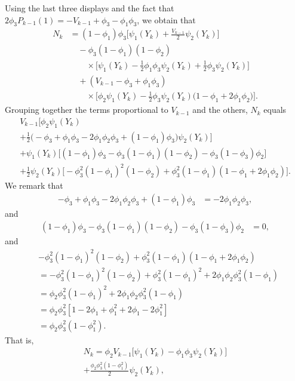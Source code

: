 \documentclass[journal]{IEEEtran}
\newcommand{\1}{\boldsymbol{1}}
\begin{document}
  Using the last three displays and the fact that
  $2\phi_3P_{k-1}(1) = -V_{k-1} + \phi_3 - \phi_1\phi_3$, we obtain that
  \begin{align*}
	N_k%
	&=(1-\phi_1)\phi_3\Big[\psi_1(Y_k) + \frac{V_{k-1}}{2}\psi_2(Y_k) \Big]\\%
        &\quad-\phi_3(1 - \phi_1)(1 - \phi_2)\\
    &\qquad\times \Big[\psi_1(Y_k) - \frac{1}{2}\phi_1\phi_3\psi_2(Y_k) + \frac{1}{2}\phi_3\psi_2(Y_k) \Big]\\%
        &\quad+(V_{k-1} - \phi_3 + \phi_1\phi_3 )\\
    &\qquad\times \Big[\phi_2\psi_1(Y_k) - \frac{1}{2}\phi_3\psi_2(Y_k)\Big(1 - \phi_1 + 2\phi_1\phi_2\Big) \Big].
  \end{align*}
  Grouping together the terms proportional to $V_{k-1}$ and the others, $N_k$ equals
  \begin{multline*}
    V_{k-1}\Big[\phi_2\psi_1(Y_k)\\
    + \frac{1}{2}\Big(-\phi_3 + \phi_1\phi_3 - 2\phi_1\phi_2\phi_3 + (1-\phi_1)\phi_3 \Big)\psi_2(Y_k) \Big]\\
   + \psi_1(Y_k)\Big[
 (1-\phi_1)\phi_3 - \phi_3(1 - \phi_1)(1 - \phi_2) - \phi_3(1-\phi_3)\phi_2
   \Big]\\
   + \frac{1}{2}\psi_2(Y_k)\Big[-\phi_3^2(1-\phi_1)^2(1-\phi_2)%
   + \phi_3^2(1-\phi_1)(1 - \phi_1 + 2\phi_1\phi_2)
   \Big].
  \end{multline*}
  We remark that
  \begin{align*}
	-\phi_3 + \phi_1\phi_3 - 2\phi_1\phi_2\phi_3 + (1-\phi_1)\phi_3%
	&= -2 \phi_1\phi_2\phi_3,
  \end{align*}
  and
  \begin{align*}
	(1-\phi_1)\phi_3 - \phi_3(1 - \phi_1)(1 - \phi_2) - \phi_3(1-\phi_3)\phi_2%
	&= 0,
  \end{align*}
  and
  \begin{align*}
	&-\phi_3^2(1-\phi_1)^2(1-\phi_2)%
   + \phi_3^2(1-\phi_1)(1 - \phi_1 + 2\phi_1\phi_2)\\
	&= -\phi_3^2(1-\phi_1)^2(1-\phi_2) + \phi_3^2(1 - \phi_1)^2 + 2\phi_1\phi_2\phi_3^2(1-\phi_1)\\
	&= \phi_2\phi_3^2(1 - \phi_1)^2 + 2 \phi_1\phi_2\phi_3^2(1 - \phi_1)\\
	&= \phi_2\phi_3^2[1 - 2\phi_1 + \phi_1^2 + 2\phi_1 - 2\phi_1^2]\\
	&= \phi_2\phi_3^2(1 - \phi_1^2).
  \end{align*}
  That is,
  \begin{multline*}
	N_k%
    = \phi_2V_{k-1} \big[\psi_1(Y_k) - \phi_1\phi_3\psi_2(Y_k)\big]\\%
   + \frac{\phi_2\phi_3^2(1 - \phi_1^2)}{2}\psi_2(Y_k),
  \end{multline*}
\end{document}
